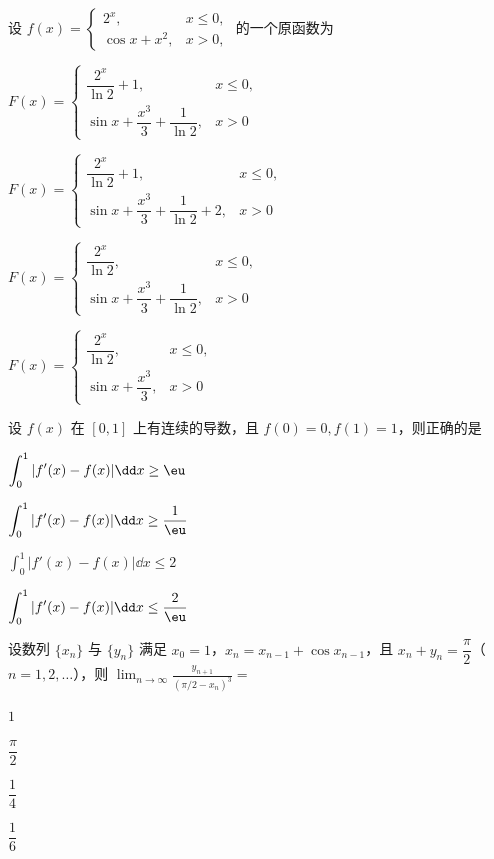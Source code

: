 
\begin{question}[index=1]
设 $f(x)=\begin{cases}2^x,&x\le0,\\\cos x+x^2,&x>0,\end{cases}$ 的一个原函数为
\begin{choices}[columns=1]
\item $F(x)=\begin{cases}\dfrac{2^x}{\ln2}+1,&x\le0,\\\sin x+\dfrac{x^3}3+\dfrac1{\ln2},&x>0\end{cases}$
\item $F(x)=\begin{cases}\dfrac{2^x}{\ln2}+1,&x\le0,\\\sin x+\dfrac{x^3}3+\dfrac1{\ln2}+2,&x>0\end{cases}$
\item $F(x)=\begin{cases}\dfrac{2^x}{\ln2},&x\le0,\\\sin x+\dfrac{x^3}3+\dfrac1{\ln2},&x>0\end{cases}$
\item $F(x)=\begin{cases}\dfrac{2^x}{\ln2},&x\le0,\\\sin x+\dfrac{x^3}3,&x>0\end{cases}$
\end{choices}
\end{question}
\QuestionBreak

\begin{question}[index=2]
设 $f(x)$ 在 $[0,1]$ 上有连续的导数，且 $f(0)=0,f(1)=1$，则正确的是
\begin{choices}[columns=2]
\item $\displaystyle\int_0^1|f'(x)-f(x)|\dd x\ge\eu$
\item $\displaystyle\int_0^1|f'(x)-f(x)|\dd x\ge\dfrac1\eu$
\item $\displaystyle\int_0^1|f'(x)-f(x)|\dd x\le2$
\item $\displaystyle\int_0^1|f'(x)-f(x)|\dd x\le\dfrac2\eu$
\end{choices}
\end{question}
\QuestionBreak

\begin{question}[index=3]
设数列 $\{x_n\}$ 与 $\{y_n\}$ 满足 $x_0=1$，$x_n=x_{n-1}+\cos x_{n-1}$，且 $x_n+y_n=\dfrac\pi2$（$n=1,2,\ldots$），则 $\displaystyle\lim_{n\to\infty}\frac{y_{n+1}}{(\pi/2-x_n)^3}=$
\begin{choices}[columns=4]
\item $1$
\item $\dfrac\pi2$
\item $\dfrac14$
\item $\dfrac16$
\end{choices}
\end{question}
\QuestionBreak

